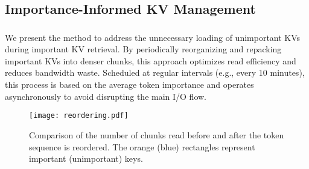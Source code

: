 \subsection{Importance-Informed KV Management}
\label{sec:techb}

\subsubsection{\techBa{}}
\label{sec:techba}


We present the \techba{} method to address the unnecessary loading of unimportant KVs during important KV retrieval. By periodically reorganizing and repacking important KVs into denser chunks, this approach optimizes read efficiency and reduces bandwidth waste.
Scheduled at regular intervals (e.g., every 10 minutes), this process is based on the average token importance and operates asynchronously to avoid disrupting the main I/O flow.


\begin{figure}
	\centering
	\texttt{[image: reordering.pdf]}
	\caption{Comparison of the number of chunks read before and after the token sequence is reordered. The orange (blue) rectangles represent important (unimportant) keys.}
	\label{fig:reordering}
	\vspace{-0.1in}
\end{figure}

